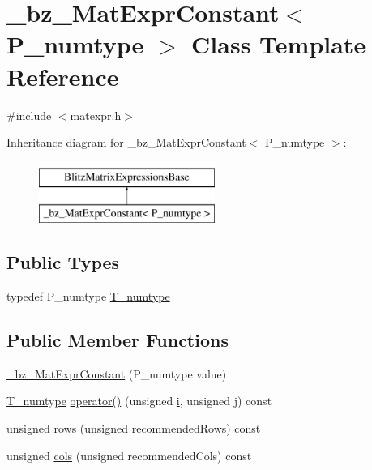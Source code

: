 \hypertarget{class__bz__MatExprConstant}{}\section{\+\_\+bz\+\_\+\+Mat\+Expr\+Constant$<$ P\+\_\+numtype $>$ Class Template Reference}
\label{class__bz__MatExprConstant}


{\ttfamily \#include $<$matexpr.\+h$>$}

Inheritance diagram for \+\_\+bz\+\_\+\+Mat\+Expr\+Constant$<$ P\+\_\+numtype $>$\+:\begin{figure}[H]
\begin{center}
\leavevmode
\includegraphics[height=2.000000cm]{class__bz__MatExprConstant}
\end{center}
\end{figure}
\subsection*{Public Types}
\begin{DoxyCompactItemize}
\item 
typedef P\+\_\+numtype \hyperlink{class__bz__MatExprConstant_a0ee43478062a24b57a03d77ad51f1abf}{T\+\_\+numtype}
\end{DoxyCompactItemize}
\subsection*{Public Member Functions}
\begin{DoxyCompactItemize}
\item 
\hyperlink{class__bz__MatExprConstant_ac04ca686850fd52f7ac1dc3547bbcf92}{\+\_\+bz\+\_\+\+Mat\+Expr\+Constant} (P\+\_\+numtype value)
\item 
\hyperlink{class__bz__MatExprConstant_a0ee43478062a24b57a03d77ad51f1abf}{T\+\_\+numtype} \hyperlink{class__bz__MatExprConstant_a981e9764ae6e9908940a3cb05e69f0ed}{operator()} (unsigned \hyperlink{indexexpr_8h_aabd77643995707c185e95c8cb2782c81}{i}, unsigned \hyperlink{indexexpr_8h_aa1f3325d66516548e69238097857fa98}{j}) const 
\item 
unsigned \hyperlink{class__bz__MatExprConstant_a41adb24a36a622b7617144d0a2f77e9b}{rows} (unsigned recommended\+Rows) const 
\item 
unsigned \hyperlink{class__bz__MatExprConstant_a7a112282c8a6ab3574908ffab3d23e9a}{cols} (unsigned recommended\+Cols) const 
\end{DoxyCompactItemize}


